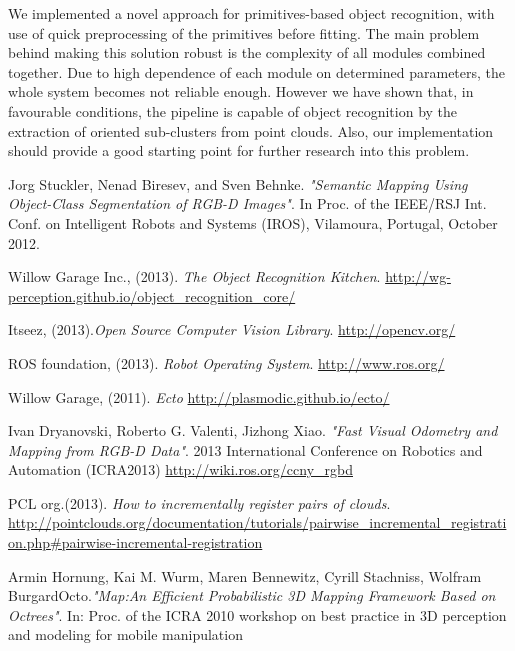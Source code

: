 \documentclass[fontsize=12pt]{article}
\begin{document}
We implemented a novel approach for primitives-based object recognition, with use of quick preprocessing of the primitives before fitting. The main problem behind making this solution robust is the complexity of all modules combined together. Due to high dependence of each module on determined parameters, the whole system becomes not reliable enough. However we have shown that, in favourable conditions, the pipeline is capable of object recognition by the extraction of oriented sub-clusters from point clouds. Also, our implementation should provide a good starting point for further research into this problem.

\begin{thebibliography}{9}

  Jorg Stuckler, Nenad Biresev, and Sven Behnke. 
  \emph{ "Semantic Mapping Using Object-Class
Segmentation of RGB-D Images"}.
  In Proc. of the IEEE/RSJ Int. Conf. on Intelligent Robots and Systems (IROS), Vilamoura, Portugal, October 2012.
  
  Willow Garage Inc., (2013). 
  \emph{The Object Recognition Kitchen}. 
  \url{http://wg-perception.github.io/object_recognition_core/}
  
  Itseez, (2013).\emph{Open Source Computer Vision Library}. 
  \url{http://opencv.org/}
  
  ROS foundation, (2013).
  \emph{Robot Operating System}.
  \url{http://www.ros.org/}
  
  Willow Garage, (2011).
  \emph{Ecto}
  \url{http://plasmodic.github.io/ecto/}
  
  Ivan Dryanovski, Roberto G. Valenti, Jizhong Xiao. \emph{"Fast Visual Odometry and Mapping from RGB-D Data"}. 2013 International Conference on Robotics and Automation (ICRA2013)
  \url{http://wiki.ros.org/ccny_rgbd}
  
  PCL org.(2013).
  \emph{How to incrementally register pairs of clouds}.
  \url{http://pointclouds.org/documentation/tutorials/pairwise_incremental_registration.php#pairwise-incremental-registration}
  
   Armin Hornung, Kai M. Wurm, Maren Bennewitz, Cyrill Stachniss, Wolfram BurgardOcto.\emph{"Map:An Efficient Probabilistic 3D Mapping Framework Based on Octrees"}. In: Proc. of the ICRA 2010 workshop on best practice in 3D perception and modeling for mobile manipulation
   

\end{thebibliography}
\end{document}
